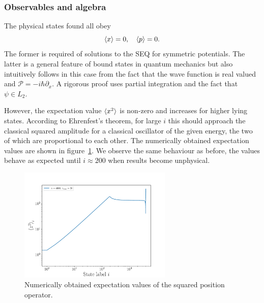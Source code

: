\documentclass[a4paper,DIV=12,english]{scrartcl}
\begin{document}
\subsubsection{Observables and algebra}
The physical states found all obey
\begin{equation}
    \braket{x} = 0, \quad \braket{p} = 0.
\end{equation}
The former is required of solutions to the SEQ for symmetric potentials. The latter is a general feature of bound states in quantum mechanics but also intuitively follows in this case from the fact that the wave function is real valued and $\mathcal{P}=-i\hbar\partial_x$. A rigorous proof uses partial integration and the fact that $\psi\in L_2$.

However, the expectation value $\braket{x^2}$ is non-zero and increases for higher lying states. According to Ehrenfest's theorem, for large $i$ this should approach the classical squared amplitude for a classical oscillator of the given energy, the two of which are proportional to each other. The numerically obtained expectation values are shown in figure~\ref{fig:pos2}. We observe the same behaviour as before, the values behave as expected until $i\approx 200$ when results become unphysical.
\begin{figure}
    \centering
    \includegraphics[width=0.65\textwidth]{../plots/pos2.pdf}
    \caption{Numerically obtained expectation values of the squared position operator.}
    \label{fig:pos2}
\end{figure}
\end{document}
